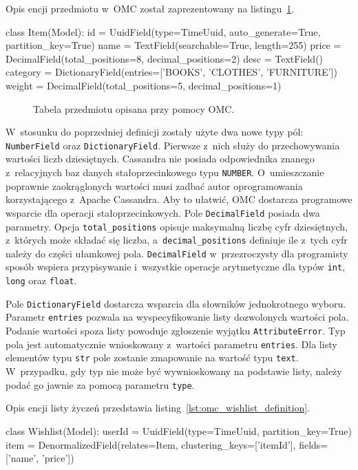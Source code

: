 Opis encji przedmiotu w~OMC został zaprezentowany na listingu~\ref{lst:omc_item_definition}. 

\begin{verbbox}
class Item(Model):
    id = UuidField(type=TimeUuid, auto_generate=True, partition_key=True)
    name = TextField(searchable=True, length=255)
    price = DecimalField(total_positions=8, decimal_positions=2)
    desc = TextField()
    category = DictionaryField(entries=['BOOKS', 'CLOTHES', 'FURNITURE'])
    weight = DecimalField(total_positions=5, decimal_positions=1)
\end{verbbox}

\begin{figure}[ht!]
	\centering
	\theverbbox
	\caption{Tabela przedmiotu opisana przy pomocy OMC.}
	\label{lst:omc_item_definition}
\end{figure}

W~stosunku do poprzedniej definicji zostały użyte dwa nowe typy pól: \verb+NumberField+ oraz \verb+DictionaryField+. Pierwsze z~nich służy do przechowywania wartości liczb dziesiętnych. Cassandra nie posiada odpowiednika znanego z~relacyjnych baz danych stałoprzecinkowego typu \verb+NUMBER+. O~umieszczanie poprawnie zaokrąglonych wartości musi zadbać autor oprogramowania korzystającego z~Apache Cassandra. Aby to ułatwić, OMC dostarcza programowe wsparcie dla operacji stałoprzecinkowych. Pole \verb+DecimalField+ posiada dwa parametry. Opcja \verb+total_positions+ opisuje maksymalną liczbę cyfr dziesiętnych, z~których może składać się liczba, a~\verb+decimal_positions+ definiuje ile z~tych cyfr należy do części ułamkowej pola. \verb+DecimalField+ w~przezroczysty dla programisty sposób wspiera przypisywanie i~wszystkie operacje arytmetyczne dla typów \verb+int+, \verb+long+ oraz \verb+float+.

Pole \verb+DictionaryField+ dostarcza wsparcia dla słowników jednokrotnego wyboru. Parametr \verb+entries+ pozwala na wyspecyfikowanie listy dozwolonych wartości pola. Podanie wartości spoza listy powoduje zgłoszenie wyjątku \verb+AttributeError+. Typ pola jest automatycznie wnioskowany z~wartości parametru \verb+entries+. Dla listy elementów typu \verb+str+ pole zostanie zmapowanie na wartość typu \verb+text+. W~przypadku, gdy typ nie może być wywnioskowany na podstawie listy, należy podać go jawnie za pomocą parametru \verb+type+.

Opis encji listy życzeń przedstawia listing~\ref{lst:omc_wishlist_definition}.

\begin{verbbox}
class Wishlist(Model):
    userId = UuidField(type=TimeUuid, partition_key=True)
    item = DenormalizedField(relates=Item, 
                             clustering_keys=['itemId'], 
                             fields=['name', 'price'])
\end{verbbox}

